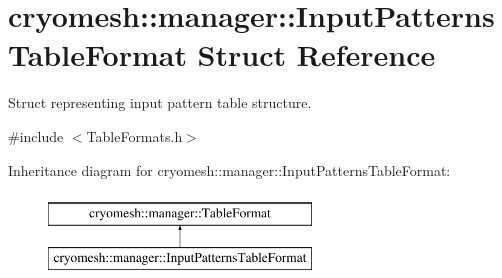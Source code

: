 \hypertarget{structcryomesh_1_1manager_1_1InputPatternsTableFormat}{\section{cryomesh\-:\-:manager\-:\-:\-Input\-Patterns\-Table\-Format \-Struct \-Reference}
\label{structcryomesh_1_1manager_1_1InputPatternsTableFormat}
}


\-Struct representing input pattern table structure.  




{\ttfamily \#include $<$\-Table\-Formats.\-h$>$}

\-Inheritance diagram for cryomesh\-:\-:manager\-:\-:\-Input\-Patterns\-Table\-Format\-:\begin{figure}[H]
\begin{center}
\leavevmode
\includegraphics[height=2.000000cm]{structcryomesh_1_1manager_1_1InputPatternsTableFormat}
\end{center}
\end{figure}
